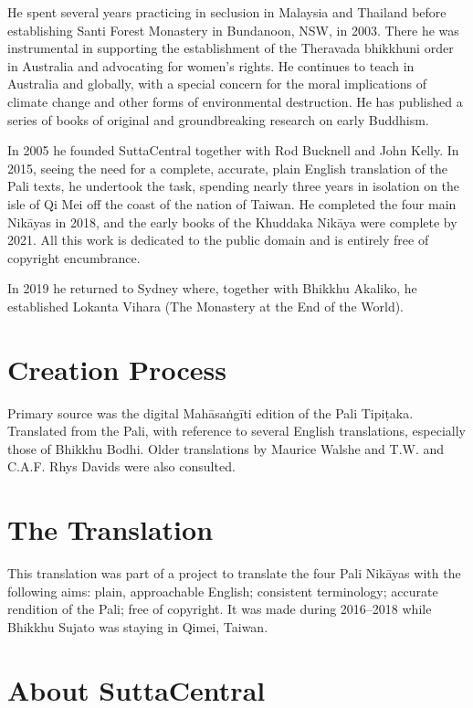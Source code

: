 \documentclass[12pt,openany]{book}%
\begin{document}
He spent several years practicing in seclusion in Malaysia and Thailand before establishing Santi Forest Monastery in Bundanoon, NSW, in 2003. There he was instrumental in supporting the establishment of the Theravada bhikkhuni order in Australia and advocating for women’s rights. He continues to teach in Australia and globally, with a special concern for the moral implications of climate change and other forms of environmental destruction. He has published a series of books of original and groundbreaking research on early Buddhism. 

In 2005 he founded SuttaCentral together with Rod Bucknell and John Kelly. In 2015, seeing the need for a complete, accurate, plain English translation of the Pali texts, he undertook the task, spending nearly three years in isolation on the isle of Qi Mei off the coast of the nation of Taiwan. He completed the four main \textsanskrit{Nikāyas} in 2018, and the early books of the Khuddaka \textsanskrit{Nikāya} were complete by 2021. All this work is dedicated to the public domain and is entirely free of copyright encumbrance. 

In 2019 he returned to Sydney where, together with Bhikkhu Akaliko, he established Lokanta Vihara (The Monastery at the End of the World). 

\section*{Creation Process}

Primary source was the digital \textsanskrit{Mahāsaṅgīti} edition of the Pali \textsanskrit{Tipiṭaka}. Translated from the Pali, with reference to several English translations, especially those of Bhikkhu Bodhi. Older translations by Maurice Walshe and T.W. and C.A.F. Rhys Davids were also consulted.

\section*{The Translation}

This translation was part of a project to translate the four Pali \textsanskrit{Nikāyas} with the following aims: plain, approachable English; consistent terminology; accurate rendition of the Pali; free of copyright. It was made during 2016–2018 while Bhikkhu Sujato was staying in Qimei, Taiwan.

\section*{About SuttaCentral}
\end{document}

